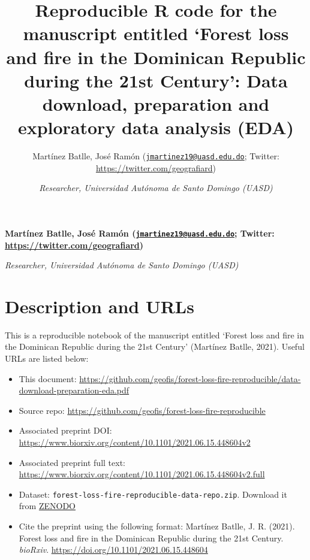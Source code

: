 \documentclass[10pt,landscape,a3paper]{article}
\title{Reproducible R code for the manuscript entitled `Forest loss and
fire in the Dominican Republic during the 21st Century': Data download,
preparation and exploratory data analysis (EDA)  }
\author{\Large Martínez Batlle, José Ramón
(\href{mailto:jmartinez19@uasd.edu.do}{\nolinkurl{jmartinez19@uasd.edu.do}};
Twitter:
\url{https://twitter.com/geografiard})\vspace{0.05in} \newline\normalsize\emph{}   \and \Large \vspace{0.05in} \newline\normalsize\emph{Researcher,
Universidad Autónoma de Santo Domingo (UASD)}  }
\date{}
\newcommand*{\authorfont}{\fontfamily{phv}\selectfont}
\begin{document}
	
%    


{%
\setlength{\parindent}{0pt}
\thispagestyle{plain}
{\fontsize{18}{20}\selectfont\raggedright 
\maketitle  %

}

{
   \vskip 13.5pt\relax \normalsize\fontsize{11}{12} 
\textbf{\authorfont Martínez Batlle, José Ramón
(\href{mailto:jmartinez19@uasd.edu.do}{\nolinkurl{jmartinez19@uasd.edu.do}};
Twitter:
\url{https://twitter.com/geografiard})} \hskip 15pt \emph{\small }   \par \textbf{\authorfont } \hskip 15pt \emph{\small Researcher,
Universidad Autónoma de Santo Domingo (UASD)}   

}

}






\vskip 6.5pt

{
\hypersetup{linkcolor=black}
\setcounter{tocdepth}{4}
\tableofcontents
}

\noindent  \hypertarget{description-and-urls}{%
\section{Description and URLs}\label{description-and-urls}}

This is a reproducible notebook of the manuscript entitled `Forest loss
and fire in the Dominican Republic during the 21st Century' (Martínez
Batlle, 2021). Useful URLs are listed below:

\begin{itemize}
\item
  This document:
  \url{https://github.com/geofis/forest-loss-fire-reproducible/data-download-preparation-eda.pdf}
\item
  Source repo:
  \url{https://github.com/geofis/forest-loss-fire-reproducible}
\item
  Associated preprint DOI:
  \url{https://www.biorxiv.org/content/10.1101/2021.06.15.448604v2}
\item
  Associated preprint full text:
  \url{https://www.biorxiv.org/content/10.1101/2021.06.15.448604v2.full}
\item
  Dataset: \texttt{forest-loss-fire-reproducible-data-repo.zip}.
  Download it from \href{https://zenodo.org/record/5681481}{ZENODO}
\item
  Cite the preprint using the following format: Martínez Batlle, J. R.
  (2021). Forest loss and fire in the Dominican Republic during the 21st
  Century. \emph{bioRxiv}.
  \url{https://doi.org/10.1101/2021.06.15.448604}
\end{itemize}
\end{document}
